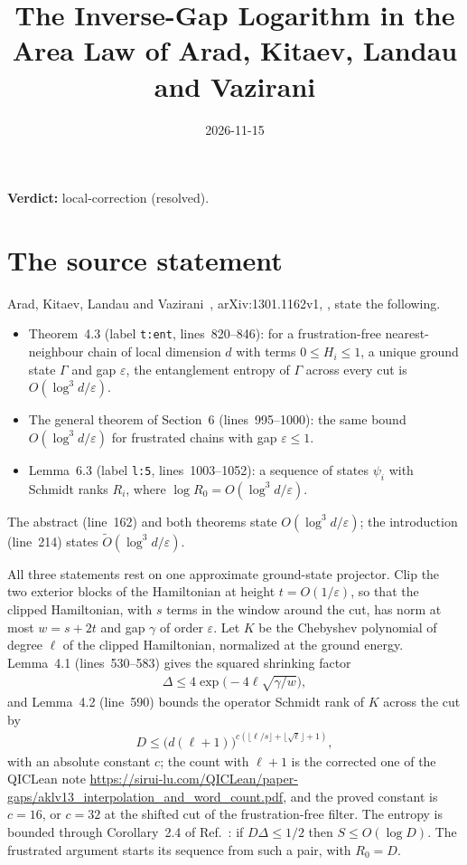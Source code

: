 \documentclass{article}
\title{The Inverse-Gap Logarithm in the Area Law of Arad, Kitaev, Landau and Vazirani}
\author{}
\date{2026-11-15}
\providecommand{\gapnote}[2]{\par\noindent\textbf{Verdict:} #1 (#2).\par}
\begin{document}
\maketitle
\gapnote{local-correction}{resolved}

\section{The source statement}

Arad, Kitaev, Landau and Vazirani~\cite{Arad2013AreaLaw},
arXiv:1301.1162v1, , state the following.
\begin{itemize}
    \item Theorem~4.3 (label \texttt{t:ent}, lines~820--846): for a
          frustration-free nearest-neighbour chain of local dimension $d$ with
          terms $0\le H_i\le1$, a unique ground state $\Gamma$ and gap
          $\varepsilon$, the entanglement entropy of $\Gamma$ across every cut
          is $O(\log^3d/\varepsilon)$.
    \item The general theorem of Section~6 (lines~995--1000): the same bound
          $O(\log^3d/\varepsilon)$ for frustrated chains with gap
          $\varepsilon\le1$.
    \item Lemma~6.3 (label \texttt{l:5}, lines~1003--1052): a sequence of
          states $\psi_i$ with Schmidt ranks $R_i$, where
          $\log R_0=O(\log^3d/\varepsilon)$.
\end{itemize}
The abstract (line~162) and both theorems state $O(\log^3d/\varepsilon)$; the
introduction (line~214) states $\tilde O(\log^3d/\varepsilon)$.

All three statements rest on one approximate ground-state projector. Clip the
two exterior blocks of the Hamiltonian at height $t=O(1/\varepsilon)$, so that
the clipped Hamiltonian, with $s$ terms in the window around the cut, has norm
at most $w=s+2t$ and gap $\gamma$ of order $\varepsilon$. Let $K$ be the
Chebyshev polynomial of degree $\ell$ of the clipped Hamiltonian, normalized at
the ground energy. Lemma~4.1 (lines~530--583) gives the squared shrinking
factor
\begin{align}
    \Delta\le4\exp\bigl(-4\ell\sqrt{\gamma/w}\bigr),
    \label{eq:aklv13_igl_shrink}
\end{align}
and Lemma~4.2 (line~590) bounds the operator Schmidt rank of $K$ across the
cut by
\begin{align}
    D\le\bigl(d(\ell+1)\bigr)^{c(\lfloor\ell/s\rfloor+\lfloor\sqrt\ell\rfloor+1)},
    \label{eq:aklv13_igl_rank}
\end{align}
with an absolute constant $c$; the count with $\ell+1$ is the corrected one of the QICLean note
\url{https://sirui-lu.com/QICLean/paper-gaps/aklv13_interpolation_and_word_count.pdf},
and the proved constant is
$c=16$, or $c=32$ at the shifted cut of the frustration-free filter. The
entropy is bounded through Corollary~2.4 of Ref.~\cite{Arad2013AreaLaw}:
if $D\Delta\le1/2$ then $S\le O(\log D)$. The frustrated argument starts its
sequence from such a pair, with $R_0=D$.
\end{document}
